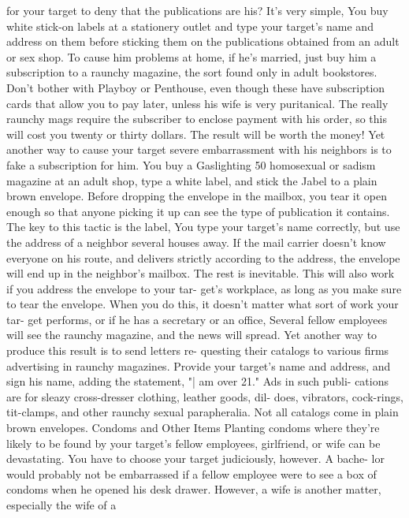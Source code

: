 \documentclass{book}
\begin{document}
for your target to deny that the publications are his? It's very 
simple, You buy white stick-on labels at a stationery outlet and 
type your target's name and address on them before sticking 
them on the publications obtained from an adult or sex shop. 
To cause him problems at home, if he's married, just buy 
him a subscription to a raunchy magazine, the sort found only 
in adult bookstores. Don't bother with Playboy or Penthouse, 
even though these have subscription cards that allow you to pay 
later, unless his wife is very puritanical. The really raunchy 
mags require the subscriber to enclose payment with his order, 
so this will cost you twenty or thirty dollars. The result will be 
worth the money! 
Yet another way to cause your target severe embarrassment 
with his neighbors is to fake a subscription for him. You buy a  Gaslighting 
50 
homosexual or sadism magazine at an adult shop, type a white 
label, and stick the Jabel to a plain brown envelope. Before 
dropping the envelope in the mailbox, you tear it open enough 
so that anyone picking it up can see the type of publication it 
contains. 
The key to this tactic is the label, You type your target's 
name correctly, but use the address of a neighbor several houses 
away. If the mail carrier doesn't know everyone on his route, 
and delivers strictly according to the address, the envelope will 
end up in the neighbor's mailbox. The rest is inevitable. 
This will also work if you address the envelope to your tar- 
get's workplace, as long as you make sure to tear the envelope. 
When you do this, it doesn't matter what sort of work your tar- 
get performs, or if he has a secretary or an office, Several fellow 
employees will see the raunchy magazine, and the news will 
spread. 
Yet another way to produce this result is to send letters re- 
questing their catalogs to various firms advertising in raunchy 
magazines. Provide your target's name and address, and sign his 
name, adding the statement, "| am over 21." Ads in such publi- 
cations are for sleazy cross-dresser clothing, leather goods, dil- 
does, vibrators, cock-rings, tit-clamps, and other raunchy sexual 
parapheralia. Not all catalogs come in plain brown envelopes. 
Condoms and Other Items 
Planting condoms where they're likely to be found by your 
target's fellow employees, girlfriend, or wife can be devastating. 
You have to choose your target judiciously, however. A bache- 
lor would probably not be embarrassed if a fellow employee 
were to see a box of condoms when he opened his desk drawer. 
However, a wife is another matter, especially the wife of a 
\end{document}
